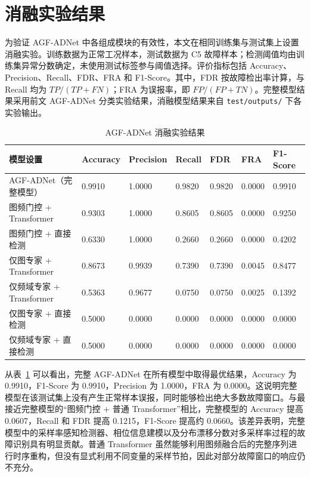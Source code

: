 \section{消融实验结果}

为验证 AGF-ADNet 中各组成模块的有效性，本文在相同训练集与测试集上设置消融实验。训练数据为正常工况样本，测试数据为 C5 故障样本；检测阈值均由训练集异常分数确定，未使用测试标签参与阈值选择。评价指标包括 Accuracy、Precision、Recall、FDR、FRA 和 F1-Score。其中，FDR 按故障检出率计算，与 Recall 均为 \(TP/(TP+FN)\)；FRA 为误报率，即 \(FP/(FP+TN)\)。完整模型结果采用前文 AGF-ADNet 分类实验结果，消融模型结果来自 \texttt{test/outputs/} 下各实验输出。

\begin{table}[!htbp]
    \centering
    \caption{AGF-ADNet 消融实验结果}
    \label{tab:agf_adnet_ablation_results}
    \begin{tabular}{p{4.3cm} p{1.6cm} p{1.6cm} p{1.6cm} p{1.4cm} p{1.4cm} p{1.7cm}}
        \toprule
        \textbf{模型设置} & \textbf{Accuracy} & \textbf{Precision} & \textbf{Recall} & \textbf{FDR} & \textbf{FRA} & \textbf{F1-Score} \\
        \midrule
        AGF-ADNet（完整模型） & 0.9910 & 1.0000 & 0.9820 & 0.9820 & 0.0000 & 0.9910 \\
        图频门控 + Transformer & 0.9303 & 1.0000 & 0.8605 & 0.8605 & 0.0000 & 0.9250 \\
        图频门控 + 直接检测 & 0.6330 & 1.0000 & 0.2660 & 0.2660 & 0.0000 & 0.4202 \\
        仅图专家 + Transformer & 0.8673 & 0.9939 & 0.7390 & 0.7390 & 0.0045 & 0.8477 \\
        仅频域专家 + Transformer & 0.5363 & 0.9677 & 0.0750 & 0.0750 & 0.0025 & 0.1392 \\
        仅图专家 + 直接检测 & 0.5000 & 0.0000 & 0.0000 & 0.0000 & 0.0000 & 0.0000 \\
        仅频域专家 + 直接检测 & 0.5000 & 0.0000 & 0.0000 & 0.0000 & 0.0000 & 0.0000 \\
        \bottomrule
    \end{tabular}
\end{table}

从表~\ref{tab:agf_adnet_ablation_results} 可以看出，完整 AGF-ADNet 在所有模型中取得最优结果，Accuracy 为 0.9910，F1-Score 为 0.9910，Precision 为 1.0000，FRA 为 0.0000。这说明完整模型在该测试集上没有产生正常样本误报，同时能够检出绝大多数故障窗口。与最接近完整模型的“图频门控 + 普通 Transformer”相比，完整模型的 Accuracy 提高 0.0607，Recall 和 FDR 提高 0.1215，F1-Score 提高约 0.0660。该差异表明，完整模型中的采样率感知检测器、相位信息建模以及分布漂移分数对多采样率过程的故障识别具有明显贡献。普通 Transformer 虽然能够利用图频融合后的完整序列进行时序重构，但没有显式利用不同变量的采样节拍，因此对部分故障窗口的响应仍不充分。

